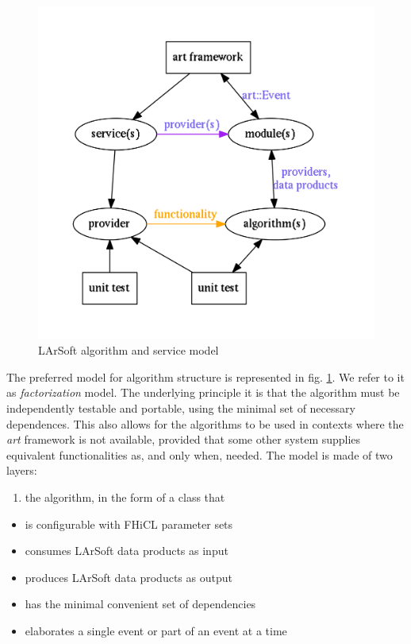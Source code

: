 \begin{figure}[htbp]
\centering
\includegraphics[width=\textwidth]{figures/LArSoftSimplifiedFactorizationModel.pdf}
\caption{\label{fig:AlgorithmModel}LArSoft algorithm and service model}
\end{figure}

The preferred model for algorithm structure is represented in fig.
\ref{fig:AlgorithmModel}. We refer to it as \emph{factorization} model.
The underlying principle it is that the algorithm must be independently
testable and portable, using the minimal set of necessary dependences.
This also allows for the algorithms to be used in contexts where the
\emph{art} framework is not available, provided that some other system
supplies equivalent functionalities as, and only when, needed. The model
is made of two layers:

\begin{enumerate}
\def\labelenumi{\arabic{enumi}.}
\item
  the algorithm, in the form of a class that
\end{enumerate}

\begin{itemize}
\item
  is configurable with FHiCL parameter sets
\item
  consumes LArSoft data products as input
\item
  produces LArSoft data products as output
\item
  has the minimal convenient set of dependencies
\item
  elaborates a single event or part of an event at a time
\end{itemize}

